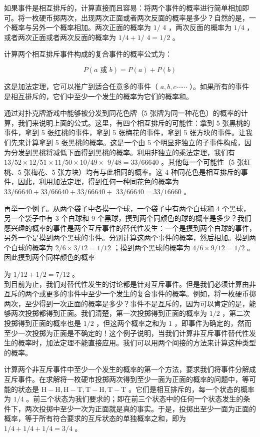 如果事件是相互排斥的，计算直接而且容易：将两个事件的概率进行简单相加即可。将一枚硬币掷两次，出现两次正面或者两次反面的概率是多少？自然的是，一个概率与另外一个概率相加。两次正面的概率为 $1 /$ 4 ，两次反面的概率为 $1 / 4$ ，或者两次正面或者两次反面的概率为 $1 / 4+1 /$ $4=1 / 2$ 。

计算两个相互排斥事件构成的复合事件的概率公式为：

$$
P(a \text { 或 } b)=P(a)+P(b)
$$

这是加法定理，它可以推广到适合任意多的事件（ $a, b, c \cdots \cdots$ ）。如果所有的事件是相互排斥的，它们中至少一个发生的概率为它们的概率和。

通过对扑克牌游戏中能够被分发到同花色牌（5 张牌为同一种花色）的概率的计算，我们来说明上面的公式。这里，有四个相互排斥的可能性：拿到 5 张黑桃的事件，拿到 5 张红桃的事件，拿到 5 张梅花的事件，拿到 5 张方块的事件。让我们先来计算拿到 5 张黑桃的概率。这是一个由 5 个明显非独立的子事件构成，因为分发到黑桃将减低下面得到黑桃的概率。利用非独立的乘法定理，我们有 $13 / 52 \times 12 / 51 \times 11 / 50 \times 10 / 49 \times$ $9 / 48=33 / 66640$ 。其他每一个可能性（5 张红桃、5 张梅花、5 张方块）均有与此相同的概率。这 4 种同花色是相互排斥的事件，因此，利用加法定理，得到任何一种同花色的概率为 $33 / 66640+33 / 66640+33 / 66640+$ $33 / 66640=33 / 16660$ 。

再举一个例子。从两个袋子中各摸一个球，一个袋子中有两个白球和 4 个黑球，另一个袋子中有 3 个白球和 9 个黑球，摸到两个同颜色的球的概率是多少？我们感兴趣的概率的事件是两个互斥事件的替代性发生：一个是摸到两个白球的事件，另外一个是摸到两个黑球的事件。分别计算这两个事件的概率，然后相加。摸到两个白球的概率为 $2 / 6 \times 3 / 12=1 / 12$ ；摸到两个黑球的概率为 $4 / 6 \times 9 / 12=1 / 2$ 。因此摸到两个同样颜色的概率

为 $1 / 12+1 / 2=7 / 12$ 。\\
到目前为止，我们对替代性发生的讨论都是针对互斥事件。但是我们必须计算由非互斥的两个或更多的事件中至少一个发生的复合事件的概率。例如，将一枚硬币掷两次，至少得到一次正面的概率是多少？事件不是互斥的，因为可以肯定的是，能够两次投掷都得到正面。我们清楚，第一次投掷得到正面的概率为 $1 / 2$ ，第二次投掷得到正面的概率也是 $1 / 2$ ，但这两个概率之和为 1 ，即事件为确定的，然而至少一次投掷为正面是不确定的！这个例子说明，当我们计算非互斥事件替代性发生的概率时，加法定理不能直接应用。我们可以用两个间接的方法来计算这种类型的概率。

计算两个非互斥事件中至少一个发生的概率的第一个方法，要求我们将事件分解成互斥事件。在求解将一枚硬市投掷两次得到至少一面为正面的概率的问题中，等可能的状态是 $\mathrm{H}-\mathrm{H}, \mathrm{H}-\mathrm{T}, \mathrm{T}-\mathrm{H}, \mathrm{T}-\mathrm{T}$ 。它们是相互排斥的，每一个状态的概率为 $1 / 4$ 。前三个状态为我们要求的；即在前三个状态中的任何一个状态发生的条件下，两次投掷中至少一次为正面就是真的事实。于是，投掷出至少一面为正面的概率，等于所有符合要求的互斥状态的单独概率之和，即为 $1 / 4+1 / 4+1 / 4=3 / 4$ 。


